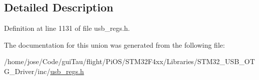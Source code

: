 \subsection{Detailed Description}


Definition at line 1131 of file usb\-\_\-regs.\-h.



The documentation for this union was generated from the following file\-:\begin{DoxyCompactItemize}
\item 
/home/jose/\-Code/gui\-Tau/flight/\-Pi\-O\-S/\-S\-T\-M32\-F4xx/\-Libraries/\-S\-T\-M32\-\_\-\-U\-S\-B\-\_\-\-O\-T\-G\-\_\-\-Driver/inc/\hyperlink{_s_t_m32_f4xx_2_libraries_2_s_t_m32___u_s_b___o_t_g___driver_2inc_2usb__regs_8h}{usb\-\_\-regs.\-h}\end{DoxyCompactItemize}
